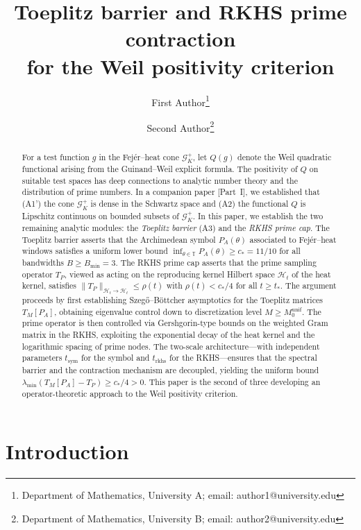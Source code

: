 \documentclass[11pt,a4paper]{article}
\title{Toeplitz barrier and RKHS prime contraction\\for the Weil positivity criterion}
\author{
  {\sc First Author}\thanks{Department of Mathematics, University A; email: author1@university.edu}
  \and
  {\sc Second Author}\thanks{Department of Mathematics, University B; email: author2@university.edu}
}
\date{}
\theoremstyle{definition}
\theoremstyle{remark}
\newcommand{\T}{\mathbb{T}}
\begin{document}
\maketitle

\begin{abstract}
For a test function $g$ in the Fej\'er--heat cone $\mathcal{G}_K^+$, let $Q(g)$ denote the Weil quadratic functional arising from the Guinand--Weil explicit formula. The positivity of $Q$ on suitable test spaces has deep connections to analytic number theory and the distribution of prime numbers. In a companion paper [Part~I], we established that (A1') the cone $\mathcal{G}_K^+$ is dense in the Schwartz space and (A2) the functional $Q$ is Lipschitz continuous on bounded subsets of $\mathcal{G}_K^+$. In this paper, we establish the two remaining analytic modules: the \emph{Toeplitz barrier} (A3) and the \emph{RKHS prime cap}. The Toeplitz barrier asserts that the Archimedean symbol $P_A(\theta)$ associated to Fej\'er--heat windows satisfies a uniform lower bound $\inf_{\theta \in \T} P_A(\theta) \geq c_* = 11/10$ for all bandwidths $B \geq B_{\min} = 3$. The RKHS prime cap asserts that the prime sampling operator $T_P$, viewed as acting on the reproducing kernel Hilbert space $\mathcal{H}_t$ of the heat kernel, satisfies $\|T_P\|_{\mathcal{H}_t \to \mathcal{H}_t} \leq \rho(t)$ with $\rho(t) < c_*/4$ for all $t \geq t_*$. The argument proceeds by first establishing Szeg\H{o}--B\"ottcher asymptotics for the Toeplitz matrices $T_M[P_A]$, obtaining eigenvalue control down to discretization level $M \geq M_0^{\mathrm{unif}}$. The prime operator is then controlled via Gershgorin-type bounds on the weighted Gram matrix in the RKHS, exploiting the exponential decay of the heat kernel and the logarithmic spacing of prime nodes. The two-scale architecture---with independent parameters $t_{\mathrm{sym}}$ for the symbol and $t_{\mathrm{rkhs}}$ for the RKHS---ensures that the spectral barrier and the contraction mechanism are decoupled, yielding the uniform bound $\lambda_{\min}(T_M[P_A] - T_P) \geq c_*/4 > 0$. This paper is the second of three developing an operator-theoretic approach to the Weil positivity criterion.
\end{abstract}

\tableofcontents

\section{Introduction}
\end{document}
